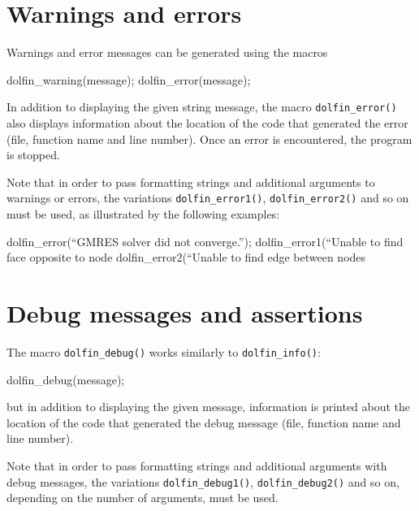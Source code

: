 \section{Warnings and errors}

Warnings and error messages can be generated using the macros
\begin{code}
  dolfin_warning(message);
  dolfin_error(message);
\end{code}

In addition to displaying the given string message, the macro
\texttt{dolfin\_error()} also displays information about the location
of the code that generated the error (file, function name and line
number). Once an error is encountered, the program is stopped.

Note that in order to pass formatting strings and additional arguments
to warnings or errors, the variations \texttt{dolfin\_error1()},
\texttt{dolfin\_error2()} and so on must be used, as illustrated by
the following examples:
\footnotesize
\begin{code}
  dolfin_error(``GMRES solver did not converge.'');
  dolfin_error1(``Unable to find face opposite to node %
  dolfin_error2(``Unable to find edge between nodes %
\end{code}
\normalsize

\section{Debug messages and assertions}

The macro \texttt{dolfin\_debug()} works similarly to
\texttt{dolfin\_info()}:
\begin{code}
  dolfin_debug(message);
\end{code}
but in addition to displaying the given message, information is printed about
the location of the code that generated the debug message (file,
function name and line number).

Note that in order to pass formatting strings and additional arguments
with debug messages, the variations \texttt{dolfin\_debug1()},
\texttt{dolfin\_debug2()} and so on, depending on the number of
arguments, must be used.

